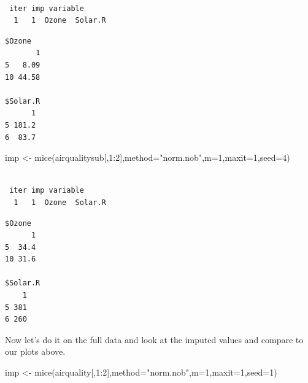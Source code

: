 \documentclass[
  letterpaper,
  DIV=11,
  numbers=noendperiod]{scrreprt}
\newenvironment{Shaded}{}{}
\newcommand{\AttributeTok}[1]{\textcolor[rgb]{0.49,0.56,0.16}{#1}}
\newcommand{\DecValTok}[1]{\textcolor[rgb]{0.25,0.63,0.44}{#1}}
\newcommand{\FunctionTok}[1]{\textcolor[rgb]{0.02,0.16,0.49}{#1}}
\newcommand{\NormalTok}[1]{#1}
\newcommand{\OtherTok}[1]{\textcolor[rgb]{0.00,0.44,0.13}{#1}}
\newcommand{\SpecialCharTok}[1]{\textcolor[rgb]{0.25,0.44,0.63}{#1}}
\newcommand{\StringTok}[1]{\textcolor[rgb]{0.25,0.44,0.63}{#1}}
\begin{document}
\begin{verbatim}

 iter imp variable
  1   1  Ozone  Solar.R
\end{verbatim}

\begin{Shaded}
\end{Shaded}

\begin{verbatim}
$Ozone
       1
5   8.09
10 44.58

$Solar.R
      1
5 181.2
6  83.7
\end{verbatim}

\begin{Shaded}
\begin{Highlighting}[]
\NormalTok{  imp }\OtherTok{\textless{}{-}} \FunctionTok{mice}\NormalTok{(airqualitysub[,}\DecValTok{1}\SpecialCharTok{:}\DecValTok{2}\NormalTok{],}\AttributeTok{method=}\StringTok{"norm.nob"}\NormalTok{,}\AttributeTok{m=}\DecValTok{1}\NormalTok{,}\AttributeTok{maxit=}\DecValTok{1}\NormalTok{,}\AttributeTok{seed=}\DecValTok{4}\NormalTok{)}
\end{Highlighting}
\end{Shaded}

\begin{verbatim}

 iter imp variable
  1   1  Ozone  Solar.R
\end{verbatim}

\begin{Shaded}
\end{Shaded}

\begin{verbatim}
$Ozone
      1
5  34.4
10 31.6

$Solar.R
    1
5 381
6 260
\end{verbatim}

Now let's do it on the full data and look at the imputed values and
compare to our plots above.

\begin{Shaded}
\begin{Highlighting}[]
\NormalTok{  imp }\OtherTok{\textless{}{-}} \FunctionTok{mice}\NormalTok{(airquality[,}\DecValTok{1}\SpecialCharTok{:}\DecValTok{2}\NormalTok{],}\AttributeTok{method=}\StringTok{"norm.nob"}\NormalTok{,}\AttributeTok{m=}\DecValTok{1}\NormalTok{,}\AttributeTok{maxit=}\DecValTok{1}\NormalTok{,}\AttributeTok{seed=}\DecValTok{1}\NormalTok{)}
\end{Highlighting}
\end{Shaded}
\end{document}
